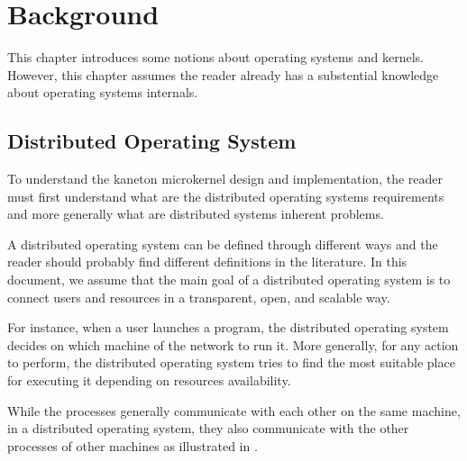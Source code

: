 %
%
%
%
%
%

%
%

\chapter{Background}
\label{chapter:background}

This chapter introduces some notions about operating systems and kernels.
However, this chapter assumes the reader already has a substential knowledge
about operating systems internals.

\newpage

%
%

%
%

\section{Distributed Operating System}

To understand the kaneton microkernel design and implementation, the reader
must first understand what are the distributed operating systems requirements
and more generally what are distributed systems inherent problems.

A distributed operating system can be defined through different ways and
the reader should probably find different definitions in the literature. In
this document, we assume that the main goal of a distributed operating
system is to connect users and resources in a transparent, open, and scalable
way.

For instance, when a user launches a program, the distributed operating system
decides on which machine of the network to run it. More generally, for
any action to perform, the distributed operating system tries to find the
most suitable place for executing it depending on resources availability.

While the processes generally communicate with each other on the same
machine, in a distributed operating system, they also communicate with the
other processes of other machines as illustrated in .

